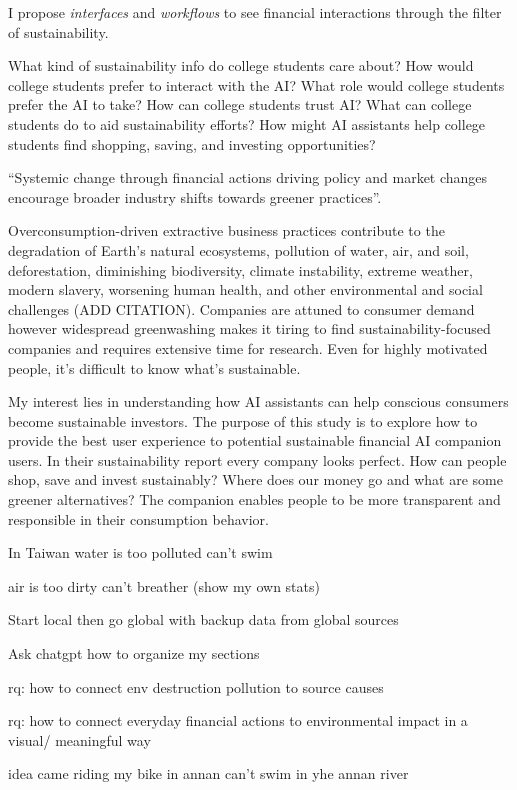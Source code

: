 \documentclass[
  letterpaper,
  DIV=11,
  numbers=noendperiod]{scrartcl}
\begin{document}
I propose \emph{interfaces} and \emph{workflows} to see financial
interactions through the filter of sustainability.

What kind of sustainability info do college students care about? How
would college students prefer to interact with the AI? What role would
college students prefer the AI to take? How can college students trust
AI? What can college students do to aid sustainability efforts? How
might AI assistants help college students find shopping, saving, and
investing opportunities?

``Systemic change through financial actions driving policy and market
changes encourage broader industry shifts towards greener practices''.

Overconsumption-driven extractive business practices contribute to the
degradation of Earth's natural ecosystems, pollution of water, air, and
soil, deforestation, diminishing biodiversity, climate instability,
extreme weather, modern slavery, worsening human health, and other
environmental and social challenges (ADD CITATION). Companies are
attuned to consumer demand however widespread greenwashing makes it
tiring to find sustainability-focused companies and requires extensive
time for research. Even for highly motivated people, it's difficult to
know what's sustainable.

My interest lies in understanding how AI assistants can help conscious
consumers become sustainable investors. The purpose of this study is to
explore how to provide the best user experience to potential sustainable
financial AI companion users. In their sustainability report every
company looks perfect. How can people shop, save and invest sustainably?
Where does our money go and what are some greener alternatives? The
companion enables people to be more transparent and responsible in their
consumption behavior.

In Taiwan water is too polluted can't swim

air is too dirty can't breather (show my own stats)

Start local then go global with backup data from global sources

Ask chatgpt how to organize my sections

rq: how to connect env destruction pollution to source causes

rq: how to connect everyday financial actions to environmental impact in
a visual/ meaningful way

idea came riding my bike in annan can't swim in yhe annan river
\end{document}
